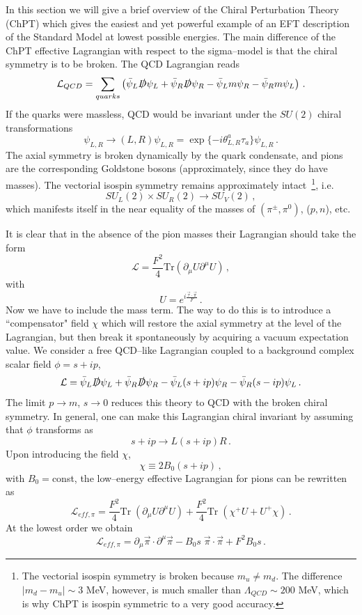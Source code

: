 \documentclass[12pt]{article}
\newcommand{\be}{\begin{equation}}
\newcommand{\ee}{\end{equation}}
\newcommand\m{\mu}
\renewcommand\t{\theta}
\def\d{\partial}
\begin{document}
In this section we will give a brief overview of the Chiral Perturbation Theory (ChPT) which
gives the easiest and yet powerful example of an EFT description
of the Standard Model at lowest possible energies.
The main difference of the ChPT effective Lagrangian with respect to the sigma--model is that
the chiral symmetry is to be broken.
The QCD Lagrangian reads
\be
\mathcal{L}_{QCD}=\sum_{quarks}\left(\bar\psi_L \slashed{D}\psi_L+\bar\psi_R \slashed{D}\psi_R -\bar \psi_L m \psi_R-\bar \psi_R m \psi_L\right)\,.
\ee
If the quarks were massless, QCD would be invariant under the $SU(2)$ chiral transformations
\be
\psi_{L,R}\to (L,R)\psi_{L,R}=\exp\{-i\t^a_{L,R}\tau_a\}  \psi_{L,R}\,.
\ee
The axial symmetry is broken dynamically by the quark condensate,
and pions are the corresponding Goldstone bosons
(approximately, since they do have masses). The vectorial isospin symmetry remains approximately
intact~\footnote{
The vectorial isospin symmetry is broken because $m_u\neq m_d$. The difference
$|m_d-m_u|\sim 3$ MeV, however, is much
smaller than $\Lambda_{QCD}\sim 200$ MeV, which is why
ChPT is isospin symmetric to a very good accuracy.
},
 i.e.
\be
SU_L(2)\times  SU_R(2) \to SU_V(2)\,,
\ee
which manifests itself in the near equality of the masses of $(\pi^{\pm},\pi^0)$, ($p,n$), etc.

It is clear that in the absence of the pion masses their Lagrangian should take the form
\be
\mathcal{L}= \frac{F^2}{4}\text{Tr}\left(\d_\m U\d^\mu U\right)\,,
\ee
with
\be
 U=e^{i\frac{\vec{\tau}\cdot \vec{\pi}}{F}}\,.
\ee
Now we have to include the mass term.
The way to do this is to introduce a ``compensator" field $\chi$
which will restore the axial symmetry at the level of the Lagrangian, but then break it
spontaneously by acquiring a vacuum expectation value.
We consider a free QCD--like Lagrangian coupled to a
background complex scalar field $\phi=s+i p$,
\be
 \mathcal{L}=\bar\psi_L \slashed{D}\psi_L+\bar\psi_R \slashed{D}\psi_R  -\bar \psi_L (s+ip) \psi_R-\bar \psi_R (s-ip)\psi_L\,.
\ee
The limit $p\to m$, $s\to 0$ reduces this theory to QCD with the broken chiral symmetry.
In general, one can make this Lagrangian chiral invariant by assuming that $\phi$
transforms as
\be
s+ip \to L (s+ip)R\,.
\ee
Upon introducing the field $\chi$,
\be
\chi\equiv 2B_0 (s+ip)\,,
\ee
with $B_0=$const, the low--energy effective Lagrangian for pions can be rewritten as
\be
\mathcal{L}_{eff,\pi}=\frac{F^2}{4}\text{Tr}\; \left(\d_\m U\d^\mu U \right) +
\frac{F^2}{4}\text{Tr}\;\left(\chi^+U + U^+ \chi\right)\,.
\ee
At the lowest order we obtain
\be
 \mathcal{L}_{eff,\pi}=\d_\m \vec{\pi}\cdot \d^\m \vec{\pi}-B_0s\; \vec{\pi}\cdot \vec{\pi}+F^2B_0s\,.
\ee
\end{document}
